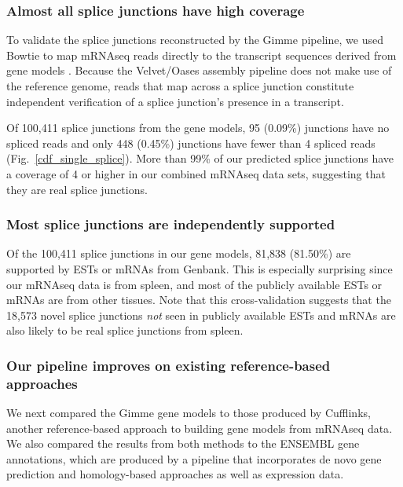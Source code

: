 \documentclass[10pt]{article}
\begin{document}
\subsubsection*{Almost all splice junctions have high coverage}

To validate the splice junctions reconstructed by the Gimme pipeline,
we used Bowtie to map mRNAseq reads directly to the transcript sequences
derived from gene models \cite{Langmead:2009fv}.  Because the
Velvet/Oases assembly pipeline does not make use of the reference
genome, reads that map across a splice junction constitute independent
verification of a splice junction's presence in a transcript.

Of 100,411 splice junctions from the gene models, 95 (0.09\%)
junctions have no spliced reads and only 448 (0.45\%) junctions
have fewer than 4 spliced reads (Fig.~\ref{cdf_single_splice}).
More than 99\% of our predicted splice junctions have a coverage
of 4 or higher in our combined mRNAseq data sets, suggesting that they are
real splice junctions.

\subsubsection*{Most splice junctions are independently supported}

Of the 100,411 splice junctions in our gene models, 81,838 (81.50\%)
are supported by ESTs or mRNAs from Genbank.  This is especially
surprising since our mRNAseq data is from spleen, and most of the
publicly available ESTs or mRNAs are from other tissues.  Note that this
cross-validation suggests that the 18,573 novel splice junctions {\em not}
seen in publicly available ESTs and mRNAs are also likely to be real
splice junctions from spleen.

\subsubsection*{Our pipeline improves on existing reference-based approaches}

We next compared the Gimme gene models to those produced by Cufflinks,
another reference-based approach to building gene models from mRNAseq
data\cite{Trapnell:2010kd}.  We also compared the results from both methods to the ENSEMBL gene annotations,
which are produced by a pipeline that incorporates de novo gene
prediction and homology-based approaches as well as expression data.
\end{document}
